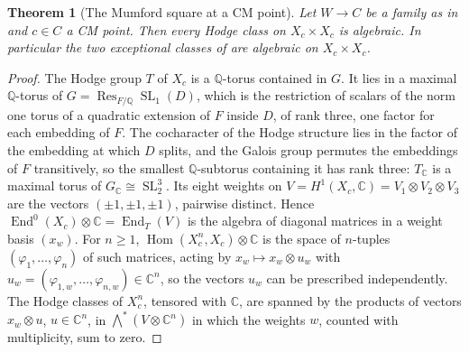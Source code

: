 \documentclass[11pt,reqno]{amsart}
\theoremstyle{plain}
\newtheorem{theorem}{Theorem}[section]
\theoremstyle{definition}
\theoremstyle{remark}
\newcommand{\QQ}{\mathbb{Q}}
\newcommand{\CC}{\mathbb{C}}
\DeclareMathOperator{\End}{End}
\DeclareMathOperator{\Res}{Res}
\DeclareMathOperator{\SL}{SL}
\begin{document}
\begin{theorem}[The Mumford square at a CM point]\label{thm:mumfordcm}
Let $W\to C$ be a family as in  and $c\in C$ a CM
point. Then every Hodge class on $X_{c}\times X_{c}$ is algebraic. In
particular the two exceptional classes of  are
algebraic on $X_{c}\times X_{c}$.
\end{theorem}

\begin{proof}
The Hodge group $T$ of $X_{c}$ is a $\QQ$-torus contained in $G$. It lies in a
maximal $\QQ$-torus of $G=\Res_{F/\QQ}\SL_{1}(D)$, which is the restriction of
scalars of the norm one torus of a quadratic extension of $F$ inside $D$, of
rank three, one factor for each embedding of $F$. The cocharacter of the Hodge
structure lies in the factor of the embedding at which $D$ splits, and the
Galois group permutes the embeddings of $F$ transitively, so the smallest
$\QQ$-subtorus containing it has rank three: $T_{\CC}$ is a maximal torus of
$G_{\CC}\cong\SL_{2}^{3}$. Its eight weights on
$V=H^{1}(X_{c},\CC)=V_{1}\otimes V_{2}\otimes V_{3}$ are the vectors
$(\pm1,\pm1,\pm1)$, pairwise distinct. Hence
$\End^{0}(X_{c})\otimes\CC=\End_{T}(V)$ is the algebra of diagonal matrices
in a weight basis $(x_{w})$. For $n\ge1$, $\operatorname{Hom}(X_{c}^{n},X_{c})
\otimes\CC$ is the space of $n$-tuples $(\varphi_{1},\dots,\varphi_{n})$ of
such matrices, acting by $x_{w}\mapsto x_{w}\otimes u_{w}$ with
$u_{w}=(\varphi_{1,w},\dots,\varphi_{n,w})\in\CC^{n}$, so the vectors $u_{w}$
can be prescribed independently. The Hodge classes of $X_{c}^{n}$, tensored
with $\CC$, are spanned by the products of vectors $x_{w}\otimes u$,
$u\in\CC^{n}$, in $\bigwedge^{*}(V\otimes\CC^{n})$ in which the weights $w$,
counted with multiplicity, sum to zero.


\end{proof}
\end{document}
